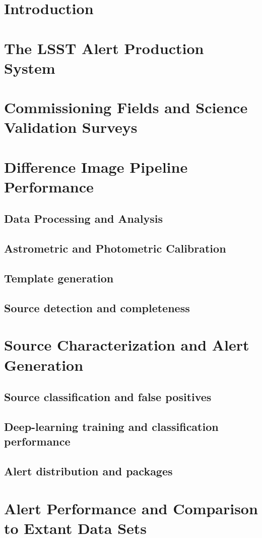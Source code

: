 \section{Introduction}


\section{The LSST Alert Production System} 

\section{Commissioning Fields and Science Validation Surveys}

\section{Difference Image Pipeline Performance}

\subsection{Data Processing and Analysis}
\subsection{Astrometric and Photometric Calibration }
\subsection{Template generation}
\subsection{Source detection and completeness}


\section{Source Characterization and Alert Generation}
\subsection{Source classification and false positives}
\subsection{Deep-learning training and classification performance}
\subsection{Alert distribution and packages}

\section{Alert Performance and Comparison to Extant Data Sets}


